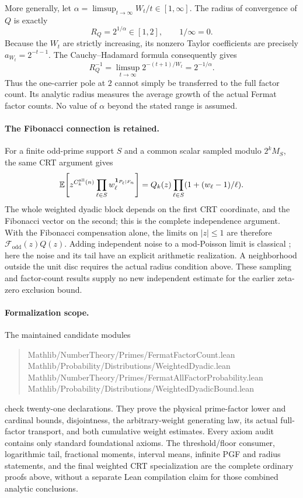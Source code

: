 \documentclass[11pt]{article}
\theoremstyle{definition}
\begin{document}
More generally, let
$\alpha=\limsup_{t\to\infty}W_t/t\in[1,\infty]$.
The radius of convergence of $Q$ is exactly
\[
 R_Q=2^{1/\alpha}\in[1,2],
 \qquad 1/\infty=0.
\]
Because the $W_t$ are strictly increasing, its nonzero Taylor
coefficients are precisely $a_{W_t}=2^{-t-1}$.
The Cauchy--Hadamard formula consequently gives
\[
 R_Q^{-1}
 =\limsup_{t\to\infty}2^{-(t+1)/W_t}
 =2^{-1/\alpha}.
\]
Thus the one-carrier pole at $2$ cannot simply be transferred
to the full factor count. Its analytic radius measures the
average growth of the actual Fermat factor counts.
No value of $\alpha$ beyond the stated range is assumed.

\paragraph{The Fibonacci connection is retained.}
For a finite odd-prime support $S$ and a common scalar sampled
modulo $2^kM_S$, the same CRT argument gives
\[
 \mathbb E\!\left[
 z^{C_k^{\rm all}(n)}
 \prod_{\ell\in S}w_\ell^{\boldsymbol{1}_{P_\ell\mid F_n}}\right]
 =Q_k(z)\prod_{\ell\in S}(1+(w_\ell-1)/\ell).
\]
The whole weighted dyadic block depends on the first CRT
coordinate, and the Fibonacci vector on the second; this is
the complete independence argument. With the Fibonacci
compensation alone, the limits on $|z|\le1$ are therefore
$\mathcal F_{\mathrm{odd}}(z)Q(z)$.
Adding independent noise to a mod-Poisson limit is classical
\cite[Example~2.2]{KN}; here the noise and its tail have an
explicit arithmetic realization. A neighborhood outside the
unit disc requires the actual radius condition above.
These sampling and factor-count results supply no new
independent estimate for the earlier zeta-zero exclusion bound.

\paragraph{Formalization scope.}
The maintained candidate modules
\begin{quote}\footnotesize\ttfamily
Mathlib/NumberTheory/Primes/FermatFactorCount.lean\\
Mathlib/Probability/Distributions/WeightedDyadic.lean\\
Mathlib/NumberTheory/Primes/FermatAllFactorProbability.lean\\
Mathlib/Probability/Distributions/WeightedDyadicBound.lean
\end{quote}
check twenty-one declarations. They prove the physical
prime-factor lower and cardinal bounds, disjointness, the
arbitrary-weight generating law, its actual full-factor
transport, and both cumulative weight estimates.
Every axiom audit contains only standard foundational axioms.
The threshold/floor consumer, logarithmic tail, fractional
moments, interval means, infinite PGF and radius statements,
and the final weighted CRT specialization are the complete
ordinary proofs above, without a separate Lean compilation
claim for those combined analytic conclusions.
\end{document}
